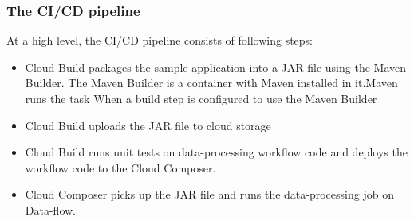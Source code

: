 \subsubsection{The CI/CD pipeline}
%
At a high level, the CI/CD pipeline consists of following steps:
\begin{itemize}
    \item Cloud Build packages the sample application into a JAR file using the Maven Builder. The Maven Builder is a container with Maven installed in it.Maven runs the task When a build step is configured to use the Maven Builder
    \item Cloud Build uploads the JAR file to cloud storage
    \item Cloud Build runs unit tests on data-processing workflow code and deploys the workflow code to the Cloud Composer.
    \item Cloud Composer picks up the JAR file and runs the data-processing job on Data-flow. 
\end{itemize}


